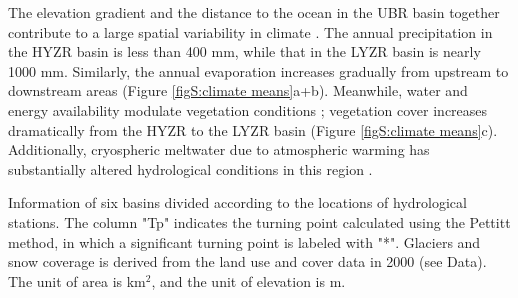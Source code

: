 \documentclass[hess, manuscript]{copernicus}
\begin{document}
The elevation gradient and the distance to the ocean in the UBR basin together contribute to a large spatial variability in climate \citep{sang2016precipitation}. The annual precipitation in the HYZR basin is less than 400 mm, while that in the LYZR basin is nearly 1000 mm. Similarly, the annual evaporation increases gradually from upstream to downstream areas (Figure \ref{figS:climate means}a+b). Meanwhile, water and energy availability modulate vegetation conditions \citep{li2019greening}; vegetation cover increases dramatically from the HYZR to the LYZR basin (Figure \ref{figS:climate means}c). Additionally, cryospheric meltwater due to atmospheric warming has substantially altered hydrological conditions in this region \citep{cuo2019warming,yao2010glacial,wang2021tp}.
\begin{table}[hb]
    \centering
    \caption{Information of six basins divided according to the locations of hydrological stations. The column "Tp" indicates the turning point calculated using the Pettitt method, in which a significant turning point is labeled with "*". Glaciers and snow coverage is derived from the land use and cover data in 2000 (see Data). The unit of area is km$^2$, and the unit of elevation is m.}
    

\end{table}
\end{document}
